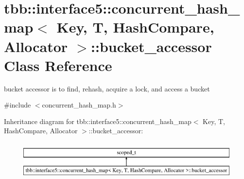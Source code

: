 \hypertarget{classtbb_1_1interface5_1_1concurrent__hash__map_1_1bucket__accessor}{}\section{tbb\+:\+:interface5\+:\+:concurrent\+\_\+hash\+\_\+map$<$ Key, T, Hash\+Compare, Allocator $>$\+:\+:bucket\+\_\+accessor Class Reference}
\label{classtbb_1_1interface5_1_1concurrent__hash__map_1_1bucket__accessor}


bucket accessor is to find, rehash, acquire a lock, and access a bucket  




{\ttfamily \#include $<$concurrent\+\_\+hash\+\_\+map.\+h$>$}

Inheritance diagram for tbb\+:\+:interface5\+:\+:concurrent\+\_\+hash\+\_\+map$<$ Key, T, Hash\+Compare, Allocator $>$\+:\+:bucket\+\_\+accessor\+:\begin{figure}[H]
\begin{center}
\leavevmode
\includegraphics[height=2.000000cm]{classtbb_1_1interface5_1_1concurrent__hash__map_1_1bucket__accessor}
\end{center}
\end{figure}
